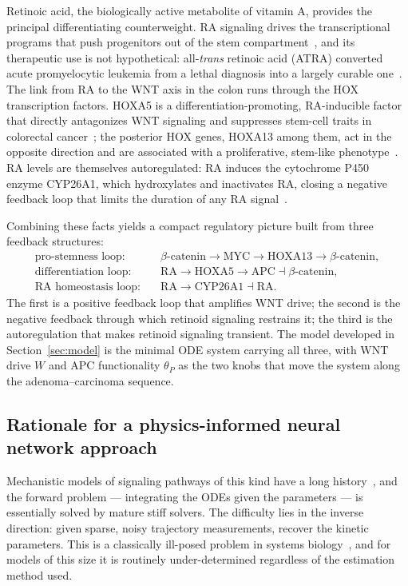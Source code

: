 \documentclass[11pt]{article}
\newcommand{\mbcat}{\beta\text{-catenin}}
\newcommand{\thP}{\theta_P}
\begin{document}
Retinoic acid, the biologically active metabolite of vitamin A, provides the
principal differentiating counterweight. RA signaling drives the
transcriptional programs that push progenitors out of the stem
compartment~\citep{rhinn2012retinoic}, and its therapeutic use is not
hypothetical: all-\emph{trans} retinoic acid (ATRA) converted acute
promyelocytic leukemia from a lethal diagnosis into a largely curable
one~\citep{degos2001atra}. The link from RA to the WNT axis in the colon runs
through the HOX transcription factors. HOXA5 is a differentiation-promoting,
RA-inducible factor that directly antagonizes WNT signaling and suppresses
stem-cell traits in colorectal cancer~\citep{ordonezmoran2015hoxa5}; the posterior
HOX genes, HOXA13 among them, act in the opposite direction and are associated
with a proliferative, stem-like phenotype~\citep{bhatlekar2014hox}. RA levels
are themselves autoregulated: RA induces the cytochrome P450 enzyme CYP26A1,
which hydroxylates and inactivates RA, closing a negative feedback loop that
limits the duration of any RA signal~\citep{white1996cyp26a1}.

Combining these facts yields a compact regulatory picture built from three
feedback structures:
\begin{align}
\text{pro-stemness loop:}\quad
&\mbcat \rightarrow \text{MYC} \rightarrow \text{HOXA13} \rightarrow \mbcat,
\label{eq:loop1}\\
\text{differentiation loop:}\quad
&\text{RA} \rightarrow \text{HOXA5} \rightarrow \text{APC} \dashv \mbcat,
\label{eq:loop2}\\
\text{RA homeostasis loop:}\quad
&\text{RA} \rightarrow \text{CYP26A1} \dashv \text{RA}.
\label{eq:loop3}
\end{align}
The first is a positive feedback loop that amplifies WNT drive; the second is
the negative feedback through which retinoid signaling restrains it; the third
is the autoregulation that makes retinoid signaling transient. The model
developed in Section~\ref{sec:model} is the minimal ODE system carrying all
three, with WNT drive $W$ and APC functionality $\thP$ as the two knobs that
move the system along the adenoma--carcinoma sequence.

\subsection{Rationale for a physics-informed neural network approach}

Mechanistic models of signaling pathways of this kind have a long
history~\citep{lee2003wnt}, and the forward problem --- integrating the ODEs
given the parameters --- is essentially solved by mature stiff solvers. The
difficulty lies in the inverse direction: given sparse, noisy trajectory
measurements, recover the kinetic parameters. This is a classically ill-posed
problem in systems
biology~\citep{engl2009inverse,chis2011structural,villaverde2016structural},
and for models of this size it is routinely under-determined regardless of the
estimation method used.
\end{document}
